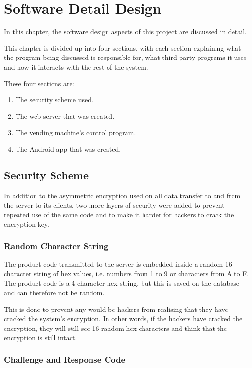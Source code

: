 \chapter{Software Detail Design}
\label{chap:4}

In this chapter, the software design aspects of this project are discussed in
detail.

This chapter is divided up into four sections, with each section explaining what
the program being discussed is responsible for, what third party programs it
uses and how it interacts with the rest of the system. 

These four sections are:

\begin{enumerate}
  \item The security scheme used.
  \item The web server that was created.
  \item The vending machine's control program.
  \item The Android app that was created.
\end{enumerate}

\section{Security Scheme}
\label{sec:security-code-scheme}

In addition to the asymmetric encryption used on all data transfer to and from
the server to its clients, two more layers of security were added to prevent
repeated use of the same code and to make it harder for hackers to crack the
encryption key.

\subsection{Random Character String}

The product code transmitted to the server is embedded inside a
random 16-character string of hex values, i.e. numbers from 1 to 9 or characters
from A to F. The product code is a 4 character hex string, but this is saved on
the database and can therefore not be random. 

This is done to prevent any would-be
hackers from realising that they have cracked the system's encryption. In other
words, if the hackers have cracked the encryption, they will still see 16
random hex characters and think that the encryption is still intact.

\subsection{Challenge and Response Code}

